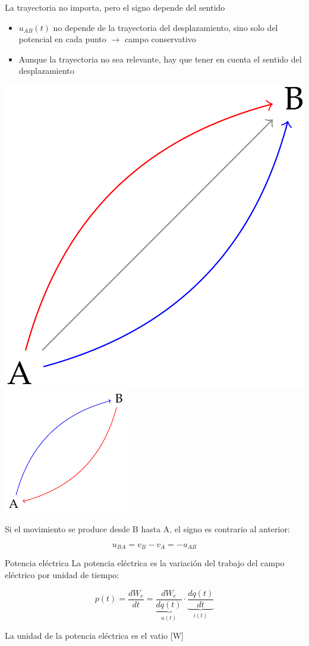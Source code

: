 \documentclass[aspectratio=169, xcolor={usenames,svgnames,dvipsnames}]{beamer}
\begin{document}
\begin{frame}{La trayectoria no importa, pero el signo depende del sentido}
\begin{minipage}[c]{0.5\linewidth}
    \begin{itemize}
    \item $u_{AB}(t)$ \alert{no depende de la trayectoria} del desplazamiento, sino solo del potencial en cada punto $\rightarrow$ \alert{campo conservativo}
    \item Aunque la trayectoria no sea relevante, hay que tener en cuenta el \alert{sentido del desplazamiento}
\end{itemize}
\end{minipage}
\hfill
\begin{minipage}[c]{0.45\linewidth}
\includegraphics[width=0.45\linewidth]{../figs/diagrama_tension.PNG}
\includegraphics[width=0.45\linewidth]{../figs/sentido_tension.pdf}
\end{minipage}

Si el movimiento se produce desde B hasta A, el signo es contrario al anterior:

\begin{equation*}
  u_{BA} = v_B - v_A = - u_{AB} 
\end{equation*}
\end{frame}

\begin{frame}{Potencia eléctrica}
La \alert{potencia eléctrica} es la variación del trabajo del campo eléctrico por unidad de tiempo:

\begin{equation*}
  p(t)=\frac{dW_{e}}{dt}= \underbrace{\dfrac{dW_e}{dq(t)}}_{u(t)} \cdot \underbrace{\dfrac{dq(t)}{dt}}_{i(t)}
\end{equation*}

La \alert{unidad} de la potencia eléctrica es el \alert{vatio} [W]
\end{frame}
\end{document}
